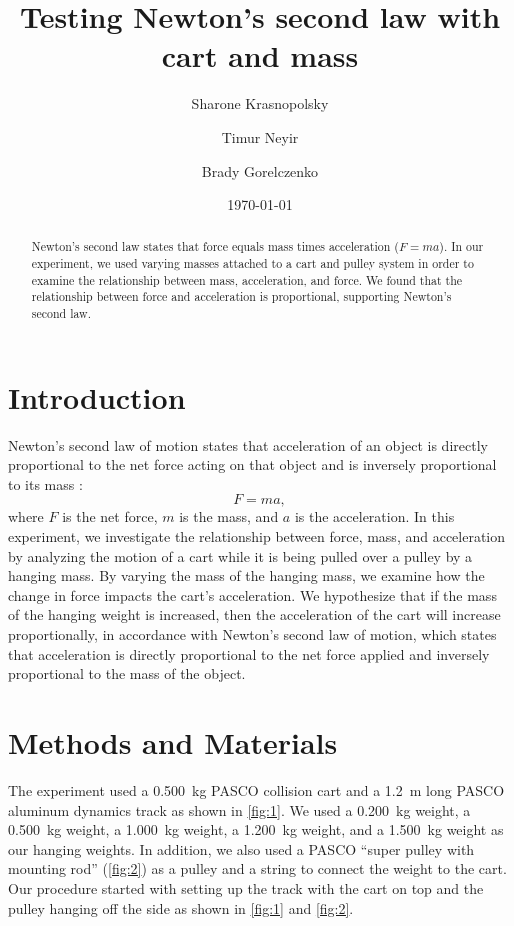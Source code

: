 ﻿\documentclass[reprint,amsmath,amssymb,aps,twoside]{revtex4-2}
\begin{document}
\setcounter{page}{23}
\title{Testing Newton's second law with cart and mass}
\author{Sharone Krasnopolsky}
\author{Timur Neyir}
\author{Brady Gorelczenko}
\date{\today}

\begin{abstract}
Newton’s second law states that force equals mass times acceleration ($F=ma$). In our experiment, we used varying masses attached to a cart and pulley system in order to examine the relationship between mass, acceleration, and force. We found that the relationship between force and acceleration is proportional, supporting Newton’s second law.
\end{abstract}


\maketitle\thispagestyle{mytitlepage}

\section{Introduction}
Newton’s second law of motion states that acceleration of an object is directly proportional to the net force acting on that object and is inversely proportional to its mass \cite{tipler}:
\begin{equation}
F = ma,
\end{equation}
where $F$ is the net force, $m$ is the mass, and $a$ is the acceleration. In this experiment, we investigate the relationship between force, mass, and acceleration by analyzing the motion of a cart while it is being pulled over a pulley by a hanging mass. By varying the mass of the hanging mass, we examine how the change in force impacts the cart’s acceleration. We hypothesize that if the mass of the hanging weight is increased, then the acceleration of the cart will increase proportionally, in accordance with Newton's second law of motion, which states that acceleration is directly proportional to the net force applied and inversely proportional to the mass of the object.






\section{Methods and Materials}
The experiment used a \qty{0.500}{\kilo\gram} PASCO collision cart and a \qty{1.2}{\meter} long PASCO aluminum dynamics track as shown in \cref{fig:1}. We used a \qty{0.200}{\kilo\gram} weight, a \qty{0.500}{\kilo\gram} weight, a \qty{1.000}{\kilo\gram} weight, a \qty{1.200}{\kilo\gram} weight, and a \qty{1.500}{\kilo\gram} weight as our hanging weights. In addition, we also used a PASCO ``super 
pulley with mounting rod'' (\cref{fig:2}) as a pulley and a string to connect the weight to the cart. Our procedure started with setting up the track with the cart on top and the pulley hanging off the side as shown in \cref{fig:1} and \cref{fig:2}.
\end{document}
